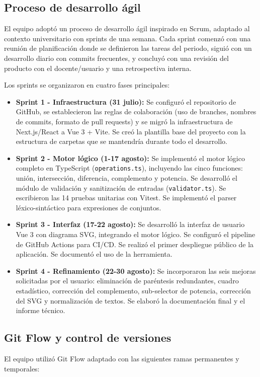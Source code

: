 \documentclass[11pt,a4paper]{article}
\begin{document}
\subsection{Proceso de desarrollo ágil}
El equipo adoptó un proceso de desarrollo ágil inspirado en Scrum, adaptado al contexto universitario con sprints de una semana. Cada sprint comenzó con una reunión de planificación donde se definieron las tareas del periodo, siguió con un desarrollo diario con commits frecuentes, y concluyó con una revisión del producto con el docente/usuario y una retrospectiva interna.

Los sprints se organizaron en cuatro fases principales:
\begin{itemize}
    \item \textbf{Sprint 1 - Infraestructura (31 julio):} Se configuró el repositorio de GitHub, se establecieron las reglas de colaboración (uso de branches, nombres de commits, formato de pull requests) y se migró la infraestructura de Next.js/React a Vue 3 + Vite. Se creó la plantilla base del proyecto con la estructura de carpetas que se mantendría durante todo el desarrollo.
    \item \textbf{Sprint 2 - Motor lógico (1-17 agosto):} Se implementó el motor lógico completo en TypeScript (\texttt{operations.ts}), incluyendo las cinco funciones: unión, intersección, diferencia, complemento y potencia. Se desarrolló el módulo de validación y sanitización de entradas (\texttt{validator.ts}). Se escribieron las 14 pruebas unitarias con Vitest. Se implementó el parser léxico-sintáctico para expresiones de conjuntos.
    \item \textbf{Sprint 3 - Interfaz (17-22 agosto):} Se desarrolló la interfaz de usuario Vue 3 con diagrama SVG, integrando el motor lógico. Se configuró el pipeline de GitHub Actions para CI/CD. Se realizó el primer despliegue público de la aplicación. Se documentó el uso de la herramienta.
    \item \textbf{Sprint 4 - Refinamiento (22-30 agosto):} Se incorporaron las seis mejoras solicitadas por el usuario: eliminación de paréntesis redundantes, cuadro estadístico, corrección del complemento, sub-selector de potencia, corrección del SVG y normalización de textos. Se elaboró la documentación final y el informe técnico.
\end{itemize}

\subsection{Git Flow y control de versiones}
El equipo utilizó Git Flow adaptado con las siguientes ramas permanentes y temporales:
\end{document}
